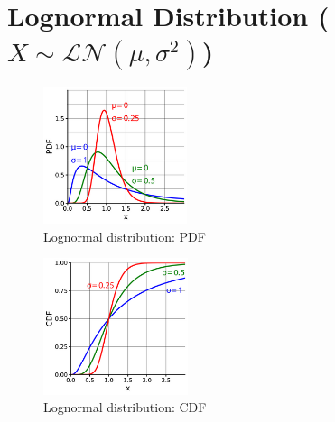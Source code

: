 \chapter{Lognormal Distribution ($X \sim \mathcal{LN}(\mu, \sigma^2)$) \cite{ism-1,wiki/Log-normal_distribution}} \label{Lognormal Distribution}

\begin{table}[H]
    \begin{minipage}{0.49\linewidth}
        \begin{figure}[H]
            \centering
            \includegraphics[width=\linewidth, height=4cm, keepaspectratio]{Pictures/distributions/Log-normal-pdfs.png}
            \caption{Lognormal distribution: PDF}
        \end{figure}
    \end{minipage}
    \hfill
    \begin{minipage}{0.49\linewidth}
        \begin{figure}[H]
            \centering
            \includegraphics[width=\linewidth, height=4cm, keepaspectratio]{Pictures/distributions/Log-normal-cdfs.png}
            \caption{Lognormal distribution: CDF}
        \end{figure}
    \end{minipage}
\end{table}



